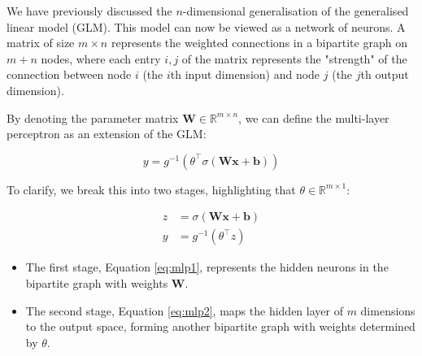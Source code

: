 We have previously discussed the $n$-dimensional generalisation of the generalised linear model (GLM). This model can now be viewed as a network of neurons. A matrix of size $m \times n$ represents the weighted connections in a bipartite graph on $m+n$ nodes, where each entry $i, j$ of the matrix represents the "strength" of the connection between node $i$ (the $i$th input dimension) and node $j$ (the $j$th output dimension).


By denoting the parameter matrix $\bm{W} \in \mathbb{R}^{m \times n}$, we can define the multi-layer perceptron as an extension of the GLM:

\[
    y = g^{-1} \left( \theta^\top \sigma (\bm{W} \bm{x} + \bm{b}) \right)
\]

To clarify, we break this into two stages, highlighting that $\theta \in \mathbb{R}^{m \times 1}$:

\begin{align}
    z & = \sigma (\bm{W} \bm{x} + \bm{b}) \label{eq:mlp1}     \\
    y & = g^{-1} \left( \theta^\top z \right) \label{eq:mlp2}
\end{align}

\begin{itemize}
    \item The first stage, Equation \ref{eq:mlp1}, represents the hidden neurons in the bipartite graph with weights $\bm{W}$.
    \item The second stage, Equation \ref{eq:mlp2}, maps the hidden layer of $m$ dimensions to the output space, forming another bipartite graph with weights determined by $\theta$.
\end{itemize}



